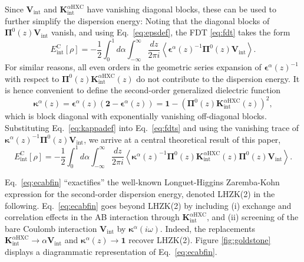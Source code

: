 \documentclass[journal=jctcce,manuscript=article]{achemso}
\begin{document}
Since $\mathbf{V}_{\text{int}}$ and $\mathbf{K}^{\alpha\text{HXC}}_\text{int}$
have vanishing diagonal blocks, these can be used to further simplify the  
dispersion energy: Noting that the diagonal blocks of $\boldsymbol{\Pi}^0(z)
\mathbf{V}_{\text{int}}$ vanish, and using
Eq.~\eqref{eq:epsdef}, the FDT \eqref{eq:fdt} takes the form
\begin{equation}
  \label{eq:fdts}
  E_{\text{int}}^{\text{C}}[\rho] = -\frac{1}{2} \int_0^1 d\alpha
  \int_{-\infty}^{\infty} \frac{dz}{2\pi i} \left\langle
      \boldsymbol{\epsilon}^\alpha(z)^{-1} \boldsymbol{\Pi}^0(z)
    \mathbf{V}_{\text{int}} \right\rangle.
\end{equation}
For similar reasons, all even orders in the geometric series expansion of
$ \boldsymbol{\epsilon}^\alpha(z)^{-1}$ with respect to
$\boldsymbol{\Pi}^0(z)
\mathbf{K}^{\alpha\text{HXC}}_{\text{int}}(z)$ do not contribute
to the dispersion energy. It is hence convenient to define the second-order  
generalized dielectric function 
\begin{equation}
  \label{eq:kappadef}
  \boldsymbol{\kappa}^\alpha(z) = \boldsymbol{\epsilon}^\alpha(z) \left(
  \mathbf{2} - \boldsymbol{\epsilon}^\alpha(z) \right) =  \mathbf{1} -
  \left( \boldsymbol{\Pi}^0(z) 
  \mathbf{K}^{\alpha\text{HXC}}_\text{int}(z) \right)^2,
\end{equation}
which is block diagonal with exponentially vanishing off-diagonal blocks. 
Substituting Eq.~\eqref{eq:kappadef} into Eq.~\eqref{eq:fdts} and using
the vanishing trace of 
$\boldsymbol{\kappa}^\alpha(z)^{-1}\boldsymbol{\Pi}^0(z)
\mathbf{V}_\text{int}$, we arrive at a central theoretical 
result of this paper, 
\begin{equation}
  \label{eq:ecabfin}
  E_{\text{int}}^{\text{C}}[\rho] = -\frac{1}{2} \int_0^1 d\alpha
  \int_{-\infty}^{\infty} \frac{dz}{2\pi i} \left\langle
    \boldsymbol{\kappa}^\alpha(z)^{-1} 
    \boldsymbol{\Pi}^0(z)
    \mathbf{K}^{\alpha\text{HXC}}_\text{int}(z) 
    \boldsymbol{\Pi}^0(z) \mathbf{V}_{\text{int}}
 \right\rangle. 
\end{equation}

Eq.~\eqref{eq:ecabfin} ``exactifies'' the well-known
Longuet-Higgins Zaremba-Kohn\cite{df9654000007,PhysRevB.13.2270}
expression for the second-order dispersion energy, denoted LHZK(2)
in the following. Eq.~\eqref{eq:ecabfin} goes beyond LHZK(2) by
including (i) exchange and correlation effects in the AB interaction through
$\mathbf{K}^{\alpha\text{HXC}}_\text{int}$, and (ii) screening 
of the bare Coulomb interaction $\mathbf{V}_{\text{int}}$ by
$\boldsymbol{\kappa}^\alpha(i\omega)$. Indeed, the
replacements $\mathbf{K}^{\alpha\text{HXC}}_\text{int} \rightarrow \alpha
\mathbf{V}_{\text{int}}$ and $\boldsymbol{\kappa}^\alpha(z)
\rightarrow \mathbf{1}$ recover LHZK(2). Figure \ref{fig:goldstone}
displays a diagrammatic representation
of
Eq.~\eqref{eq:ecabfin}.
\end{document}

